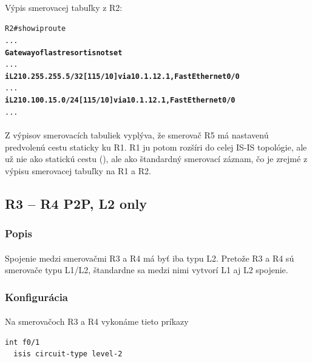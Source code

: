 \documentclass[12pt,twoside,a4paper]{report}
\begin{document}
\paragraph{}
Výpis smerovacej tabuľky z R2:

\noindent
{\selectfont
\begin{small}
\begin{alltt}
R2#show ip route
...
\textbf{Gateway of last resort is not set}
...
\textbf{i L2    10.255.255.5/32 [115/10] via 10.1.12.1, FastEthernet0/0}
...
\textbf{i L2    10.100.15.0/24 [115/10] via 10.1.12.1, FastEthernet0/0}
...
\end{alltt}
\end{small}
}

\paragraph{}
Z výpisov smerovacích tabuliek vyplýva, že smerovač R5 má nastavenú predvolenú cestu staticky ku R1. R1 ju potom rozšíri do celej IS-IS topológie, ale už nie ako statickú cestu (), ale ako štandardný smerovací záznam, čo je zrejmé z výpisu smerovacej tabuľky na R1 a R2.





\subsection{R3 – R4 P2P, L2 only}
\subsubsection{Popis}
\paragraph{}
Spojenie medzi smerovačmi R3 a R4 má byť iba typu L2. Pretože R3 a R4 sú smerovače typu L1/L2, štandardne sa medzi nimi vytvorí L1 aj L2 spojenie.

\subsubsection{Konfigurácia}
\paragraph{}
Na smerovačoch R3 a R4 vykonáme tieto príkazy

\noindent
{\selectfont
\begin{small}
\begin{verbatim}
int f0/1
  isis circuit-type level-2
\end{verbatim}
\end{small}
}
\end{document}
